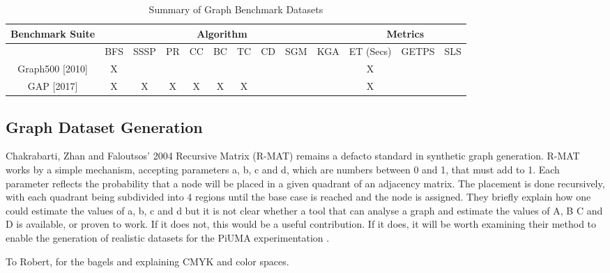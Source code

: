 \documentclass[sigconf,authordraft]{acmart}
\begin{document}
\begin{table*}[t]
  \begin{tabular}{ |c|c|c|c|c|c|c|c|c|c|c|c|c|}
    \hline
    {Benchmark Suite} & \multicolumn{9}{|c|}{Algorithm} & \multicolumn{3}{|c|}{Metrics} \\
    \hline
               & BFS & SSSP & PR & CC & BC & TC & CD & SGM & KGA & ET (Secs) & GETPS & SLS \\
    \hline
     Graph500 [2010]\cite{Murphy2010}  &  X  &      &    &    &    &    &    &     &     &    X      &       &     \\
     GAP [2017]\cite{Beamer2017}       &  X  &   X  &  X &  X &  X &  X &    &     &     &    X      &       &     \\
    \hline
  \end{tabular}
  \caption{Summary of Graph Benchmark Datasets}
  \label{table:graphBenchmarks}
\end{table*}


\subsection{Graph Dataset Generation}

\par{Chakrabarti, Zhan and Faloutsos' 2004 Recursive Matrix (R-MAT) remains a defacto standard in synthetic graph generation. 
R-MAT works by a simple mechanism, accepting parameters a, b, c and d, which are numbers between 0 and 1, that must add to 1. 
Each parameter reflects the probability that a node will be placed in a given quadrant of an adjacency matrix. 
The placement is done recursively, with each quadrant being subdivided into 4 regions until the base case is reached and the node is assigned. 
They briefly explain how one could estimate the values of a, b, c and d but it is not clear whether a tool that can analyse a graph and estimate the values of A, B C and D is available, or proven to work. 
If it does not, this would be a useful contribution. 
If it does, it will be worth examining their method to enable the generation of realistic datasets for the PiUMA experimentation \cite{Chakrabarti2004}.}


\begin{acks}
To Robert, for the bagels and explaining CMYK and color spaces.
\end{acks}




\end{document}
